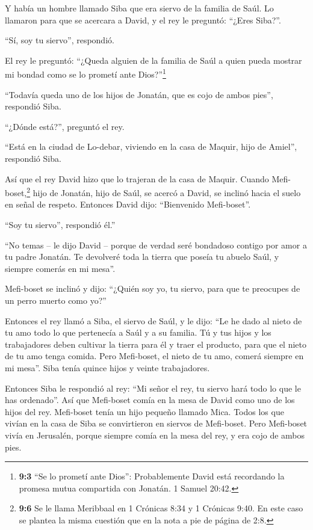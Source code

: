  Y había un hombre llamado Siba que era siervo de la familia
de Saúl. Lo llamaron para que se acercara a David, y el rey le preguntó:
``¿Eres Siba?''.

``Sí, soy tu siervo'', respondió.

 El rey le preguntó: ``¿Queda alguien de la familia de Saúl
a quien pueda mostrar mi bondad como se lo prometí ante
Dios?''\footnote{\textbf{9:3} ``Se lo prometí ante Dios'': Probablemente
  David está recordando la promesa mutua compartida con Jonatán. 1
  Samuel 20:42.}

``Todavía queda uno de los hijos de Jonatán, que es cojo de ambos
pies'', respondió Siba.

 ``¿Dónde está?'', preguntó el rey.

``Está en la ciudad de Lo-debar, viviendo en la casa de Maquir, hijo de
Amiel'', respondió Siba.

 Así que el rey David hizo que lo trajeran de la casa de
Maquir.  Cuando Mefi-boset,\footnote{\textbf{9:6} Se le
  llama Meribbaal en 1 Crónicas 8:34 y 1 Crónicas 9:40. En este caso se
  plantea la misma cuestión que en la nota a pie de página de 2:8.} hijo
de Jonatán, hijo de Saúl, se acercó a David, se inclinó hacia el suelo
en señal de respeto. Entonces David dijo: ``Bienvenido Mefi-boset''.

``Soy tu siervo'', respondió él.''

 ``No temas -- le dijo David -- porque de verdad seré
bondadoso contigo por amor a tu padre Jonatán. Te devolveré toda la
tierra que poseía tu abuelo Saúl, y siempre comerás en mi mesa''.

 Mefi-boset se inclinó y dijo: ``¿Quién soy yo, tu siervo,
para que te preocupes de un perro muerto como yo?''

 Entonces el rey llamó a Siba, el siervo de Saúl, y le dijo:
``Le he dado al nieto de tu amo todo lo que pertenecía a Saúl y a su
familia.  Tú y tus hijos y los trabajadores deben cultivar
la tierra para él y traer el producto, para que el nieto de tu amo tenga
comida. Pero Mefi-boset, el nieto de tu amo, comerá siempre en mi
mesa''. Siba tenía quince hijos y veinte trabajadores.

 Entonces Siba le respondió al rey: ``Mi señor el rey, tu
siervo hará todo lo que le has ordenado''. Así que Mefi-boset comía en
la mesa de David como uno de los hijos del rey.  Mefi-boset
tenía un hijo pequeño llamado Mica. Todos los que vivían en la casa de
Siba se convirtieron en siervos de Mefi-boset.  Pero
Mefi-boset vivía en Jerusalén, porque siempre comía en la mesa del rey,
y era cojo de ambos pies.

